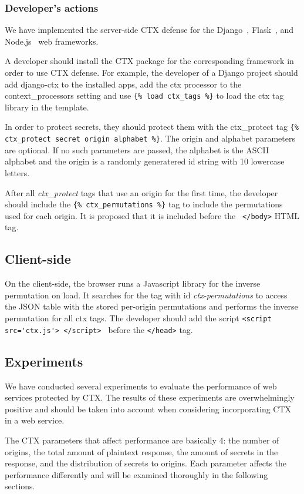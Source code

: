 \documentclass[a4paper, 11 pt, conference]{article}  %
\begin{document}
\subsubsection{Developer's actions}
We have implemented the server-side CTX defense for the Django~\cite{c13},
Flask~\cite{c14}, and Node.js~\cite{c15} web frameworks.

A developer should install the CTX package for the corresponding framework in
order to use CTX defense. For example, the developer of a Django project should
add django-ctx to the installed apps, add the ctx processor to the
context\_processors setting and use \lstinline|{% load ctx_tags %}| to load the ctx tag library in the template.

In order to protect secrets, they should protect them with the ctx\_protect tag \lstinline|{% ctx_protect secret origin alphabet %}|. The origin and alphabet parameters are optional. If no such parameters are passed, the alphabet is the ASCII alphabet and the origin is a randomly generatered id string with 10 lowercase letters.

After all \textit{ctx\_protect} tags that use an origin for the first time, the developer should include the \lstinline|{% ctx_permutations %}| tag to include the permutations used for each origin. It is proposed that it is included before the \lstinline| </body>| HTML tag.

\subsection{Client-side}
On the client-side, the browser runs a Javascript library for the inverse permutation on load. It searches for the tag with id \textit{ctx-permutations} to access the JSON table with the stored per-origin permutations and performs the inverse permutation for all ctx tags.
The developer should add the script \lstinline|<script src='ctx.js'> </script> | before the \lstinline|</head>| tag.

\subsection{Experiments}
We have conducted several experiments to evaluate the performance of web
services protected by CTX. The results of these experiments are overwhelmingly
positive and should be taken into account when considering incorporating CTX in
a web service.

The CTX parameters that affect performance are basically 4: the number of
origins, the total amount of plaintext response, the amount of secrets in the
response, and the distribution of secrets to origins. Each parameter affects the
performance differently and will be examined thoroughly in the following
sections.
\end{document}
